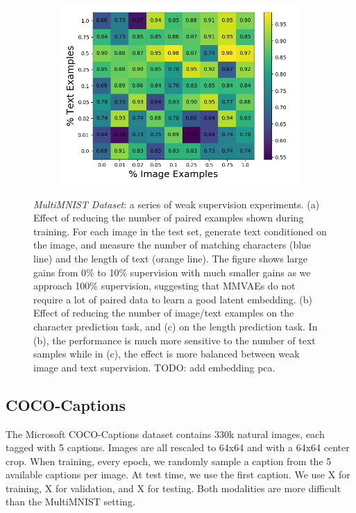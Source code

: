 \documentclass{article}
\begin{document}
\begin{figure}[!h]
\begin{subfigure}[b]{.32\linewidth}
        \includegraphics[width=\linewidth]{multimnist_mmvae_modal_length_weak_supervision.png}
        \caption{}
    \end{subfigure}
    \caption{\emph{MultiMNIST Dataset}: a series of weak supervision experiments. (a) Effect of reducing the number of paired examples shown during training. For each image in the test set, generate text conditioned on the image, and measure the number of matching characters (blue line) and the length of text (orange line). The figure shows large gains from 0\% to 10\% supervision with much smaller gains as we approach 100\% supervision, suggesting that MMVAEs do not require a lot of paired data to learn a good latent embedding. (b) Effect of reducing the number of image/text examples on the character prediction task, and (c) on the length prediction task. In (b), the performance is much more sensitive to the number of text samples while in (c), the effect is more balanced between weak image and text supervision. TODO: add embedding pca.}
    \label{fig:multimnist:weaksupervision}
\end{figure}

\subsection{COCO-Captions}

The Microsoft COCO-Captions dataset contains 330k natural images, each tagged with 5 captions. Images are all rescaled to 64x64 and with a 64x64 center crop. When training, every epoch, we randomly sample a caption from the 5 available captions per image. At test time, we use the first caption. We use X for training, X for validation, and X for testing. Both modalities are more difficult than the MultiMNIST setting.
\end{document}
